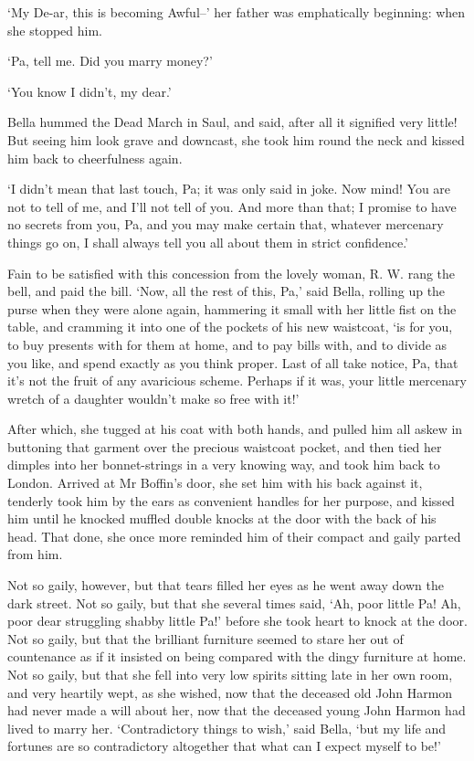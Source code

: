 ‘My De-ar, this is becoming Awful--’ her father was emphatically
beginning: when she stopped him.

‘Pa, tell me. Did you marry money?’

‘You know I didn’t, my dear.’

Bella hummed the Dead March in Saul, and said, after all it signified
very little! But seeing him look grave and downcast, she took him round
the neck and kissed him back to cheerfulness again.

‘I didn’t mean that last touch, Pa; it was only said in joke. Now mind!
You are not to tell of me, and I’ll not tell of you. And more than that;
I promise to have no secrets from you, Pa, and you may make certain
that, whatever mercenary things go on, I shall always tell you all about
them in strict confidence.’

Fain to be satisfied with this concession from the lovely woman, R. W.
rang the bell, and paid the bill. ‘Now, all the rest of this, Pa,’ said
Bella, rolling up the purse when they were alone again, hammering it
small with her little fist on the table, and cramming it into one of the
pockets of his new waistcoat, ‘is for you, to buy presents with for them
at home, and to pay bills with, and to divide as you like, and spend
exactly as you think proper. Last of all take notice, Pa, that it’s
not the fruit of any avaricious scheme. Perhaps if it was, your little
mercenary wretch of a daughter wouldn’t make so free with it!’

After which, she tugged at his coat with both hands, and pulled him all
askew in buttoning that garment over the precious waistcoat pocket, and
then tied her dimples into her bonnet-strings in a very knowing way, and
took him back to London. Arrived at Mr Boffin’s door, she set him with
his back against it, tenderly took him by the ears as convenient handles
for her purpose, and kissed him until he knocked muffled double knocks
at the door with the back of his head. That done, she once more reminded
him of their compact and gaily parted from him.

Not so gaily, however, but that tears filled her eyes as he went away
down the dark street. Not so gaily, but that she several times said,
‘Ah, poor little Pa! Ah, poor dear struggling shabby little Pa!’
before she took heart to knock at the door. Not so gaily, but that the
brilliant furniture seemed to stare her out of countenance as if it
insisted on being compared with the dingy furniture at home. Not so
gaily, but that she fell into very low spirits sitting late in her own
room, and very heartily wept, as she wished, now that the deceased old
John Harmon had never made a will about her, now that the deceased young
John Harmon had lived to marry her. ‘Contradictory things to wish,’ said
Bella, ‘but my life and fortunes are so contradictory altogether that
what can I expect myself to be!’



